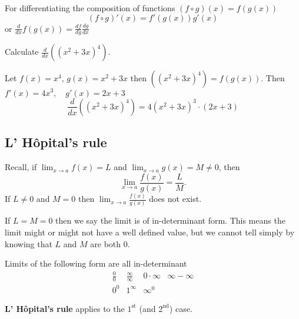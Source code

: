\documentclass[10pt, a4paper]{article}
\begin{document}
For differentiating the composition of functions $(f \circ g)(x) = f(g(x))$
\[
(f \circ g)'(x) = f'(g(x))g'(x)
\]
or $\frac{d}{dx}f(g(x)) = \frac{df}{dg}\frac{dg}{dx}$

\begin{example}
    Calculate $\frac{d}{dx}\left((x ^ 2 + 3x) ^ 4\right)$.

    Let $f(x) = x ^ 4,\,g(x) = x ^ 2 + 3x$ then $\left((x ^ 2 + 3x) ^ 4\right) = f(g(x))$. Then $f'(x) = 4x ^ 3,\quad g'(x) = 2x + 3$
    \[
    \frac{d}{dx}\left((x ^ 2 + 3x) ^ 4\right) = 4(x ^ 2 + 3x) ^ 3 \cdot (2x + 3)
    \]
\end{example}

\subsection{L' H\^opital's rule}
Recall, if $\lim_{x \rightarrow a}f(x) = L$ and $\lim_{x \rightarrow a}g(x) = M \neq 0$, then
\[
\lim_{x \rightarrow a}\frac{f(x)}{g(x)} = \frac{L}{M}.
\]
If $L \neq 0$ and $M = 0$ then $\lim_{x \rightarrow a}\frac{f(x)}{g(x)}$ does not exist.

If $L = M = 0$ then we say the limit is of in-determinant form. This means the limit might or might not have a well defined value, but we cannot tell simply by knowing that $L$ and $M$ are both $0$.

Limits of the following form are all in-determinant
\begin{align*}
    \frac{0}{0} & \frac{\infty}{\infty} & 0 \cdot \infty & \infty - \infty \\
    0 ^ 0 & 1 ^ \infty & \infty^0
\end{align*}

\textbf{L' H\^opital's rule} applies to the $1^{\text{st}}$ (and $2^{\text{nd}}$) case.
\end{document}
